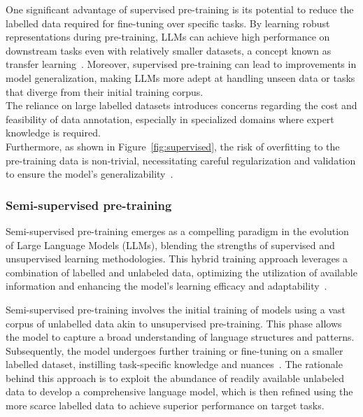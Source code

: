 One significant advantage of supervised pre-training is its potential to reduce the labelled data required for fine-tuning over specific tasks.
By learning robust representations during pre-training, LLMs can achieve high performance on downstream tasks even with relatively smaller datasets, a concept known as transfer learning~\cite{ruder2019transfer}.
Moreover, supervised pre-training can lead to improvements in model generalization, making LLMs more adept at handling unseen data or tasks that diverge from their initial training corpus.\\

The reliance on large labelled datasets introduces concerns regarding the cost and feasibility of data annotation, especially in specialized domains where expert knowledge is required.\\
Furthermore, as shown in Figure~\ref{fig:supervised}, the risk of overfitting to the pre-training data is non-trivial, necessitating careful regularization and validation to ensure the model's generalizability~\cite{howard2018universal}.

\subsubsection{Semi-supervised pre-training}
\label{subsubsec:semi-supervised-pre-training}

Semi-supervised pre-training emerges as a compelling paradigm in the evolution of Large Language Models (LLMs), blending the strengths of supervised and unsupervised learning methodologies.
This hybrid training approach leverages a combination of labelled and unlabeled data, optimizing the utilization of available information and enhancing the model's learning efficacy and adaptability~\cite{zhu2005semi, chapelle2009semi}.

Semi-supervised pre-training involves the initial training of models using a vast corpus of unlabelled data akin to unsupervised pre-training.
This phase allows the model to capture a broad understanding of language structures and patterns.
Subsequently, the model undergoes further training or fine-tuning on a smaller labelled dataset, instilling task-specific knowledge and nuances~\cite{ruder2019transfer, yang2017transfer}.
The rationale behind this approach is to exploit the abundance of readily available unlabeled data to develop a comprehensive language model, which is then refined using the more scarce labelled data to achieve superior performance on target tasks.

